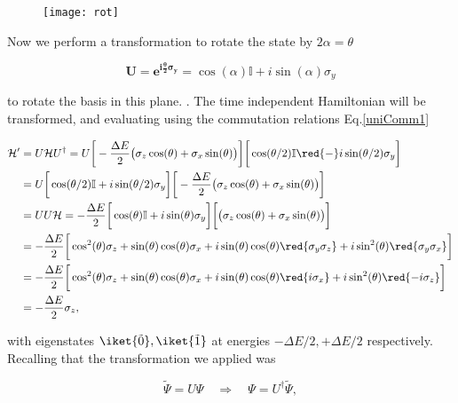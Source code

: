 \begin{figure}[h]
  \centering \texttt{[image: rot]}
\end{figure}

\noindent

\noindent  Now  we perform  a  transformation  to  rotate the  state  by
$ 2\alpha = \theta $

  \begin{equation}
    \mathbf{U=e^{i\frac{\theta}{2}\sigma_y}} =  \cos(\alpha)\mathbb{I}+i\sin(\alpha)\sigma_y
  \end{equation}

  \noindent to rotate  the basis in this  plane.  .  The
  {time  independent Hamiltonian}  will be  transformed, and  evaluating
  using the commutation relations Eq.\eqref{uniComm1}

  \begin{equation}\label{uniRot}
    \begin{aligned}
      \mathcal{H}' & = U\mathcal{H}U^{\dagger} = U \bigg[-\frac{\Delta E}{2}\big(\sigma_z\cos(\theta)+\sigma_x\sin(\theta)\big)\bigg]\bigg[\cos(\theta/2)\mathbb{I}\red{-}i\sin(\theta/2)\sigma_y\bigg]\\
      & = U \bigg[\cos(\theta/2)\mathbb{I}+i\sin(\theta/2)\sigma_y\bigg]\bigg[-\frac{\Delta E}{2}\big(\sigma_z\cos(\theta)+\sigma_x\sin(\theta)\big)\bigg]\\
      & = UU\mathcal{H} =-\frac{\Delta E}{2} \bigg[\cos(\theta)\mathbb{I}+i\sin(\theta)\sigma_y\bigg]\bigg[\big(\sigma_z\cos(\theta)+\sigma_x\sin(\theta)\big)\bigg]\\
      & = -\frac{\Delta E}{2}\bigg[\cos^2(\theta)\sigma_z+\sin(\theta)\cos(\theta)\sigma_x+i\sin(\theta)\cos(\theta)\red{\sigma_y\sigma_z}+i\sin^2(\theta)\red{\sigma_y\sigma_x}\bigg]\\
      & = -\frac{\Delta E}{2}\bigg[\cos^2(\theta)\sigma_z+\sin(\theta)\cos(\theta)\sigma_x+i\sin(\theta)\cos(\theta)\red{i\sigma_x}+i\sin^2(\theta)\red{-i\sigma_z}\bigg]\\
      & = -\frac{\Delta E}{2}\sigma_z,
    \end{aligned}
  \end{equation}


  \noindent with  eigenstates $ \iket{\tilde{0}}, \iket{\tilde{1}}  $ at
  energies $  -\Delta E/2, +\Delta  E/2 $ respectively.   Recalling that
  the transformation we applied was

  \begin{equation}\label{uniTransform}
    \tilde{\Psi} = U\Psi \quad\Rightarrow\quad \Psi = U^{\dagger}\tilde{\Psi},
  \end{equation}

